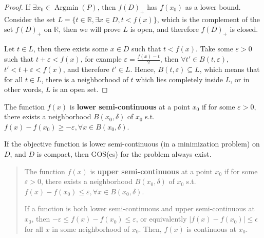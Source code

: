 \begin{proof}
  If \( \exists x_{0} \in \operatorname{Argmin}(P) \), then \( f(D)_{+}
  \) has \( f(x_{0}) \) as a lower bound. Consider the set \( L = \{t \in
  \mathbb{R}, \exists x\in D, t < f(x)\}   \), which is the complement of
  the set \( f(D)_{+} \) on \( \mathbb{R} \), then we will prove \( L \) is
  open, and therefore \( f(D)_{+} \) is closed.

  Let \( t \in L \), then there exists some \( x \in D \) such that \( t <
  f(x) \). Take some \( \varepsilon > 0 \) such that \( t + \varepsilon <
  f(x) \), for example \( \varepsilon = \frac{f(x) - t}{2} \), then 
  \( \forall t' \in B(t, \varepsilon) \), \( t' < t + \varepsilon <
  f(x) \), and therefore \( t' \in L \). Hence, \( B(t, \varepsilon) \subseteq
  L\), which means that for all \( t \in L \), there is a neighborhood of \(
  t\) which lies completely inside \( L \), or in other words, \( L \) is an
  open set.
\end{proof}

\begin{theorem}
\label{thr:LSC compact condition}
  The function \( f(x) \) is \textbf{lower semi-continuous} at a point \( x_{0} \) if for
  some \( \varepsilon > 0 \), there exists a neighborhood \( B(x_{0}, \delta) \) of
  \( x_{0} \) s.t. \( f(x) - f(x_{0}) \ge  -\varepsilon, \forall x \in B(x_{0},
  \delta)\).

  If the objective function is lower semi-continuous (in a minimization problem)
  on \( D \), and \( D \) is compact, then GOS(es) for the problem always exist.
\end{theorem}

\begin{quote}
  The function \( f(x) \) is \textbf{upper semi-continuous} at a point \( x_{0} \) if for
  some \( \varepsilon > 0 \), there exists a neighborhood \( B(x_{0}, \delta) \) of
  \( x_{0} \) s.t. \( f(x) - f(x_{0}) \le  \varepsilon, \forall x \in B(x_{0},
  \delta)\).

  If a function is both lower semi-continuous and upper semi-continuous at \( x_{0} \),
  then \(
  -\varepsilon \le  f(x) - f(x_{0}) \le  \varepsilon\), or equivalently \( |f(x)
  - f(x_{0})| \le  \epsilon\) for all \( x \) in some
  neighborhood of \( x_{0} \). Then, \( f(x) \) is continuous at \( x_{0} \).
\end{quote}

